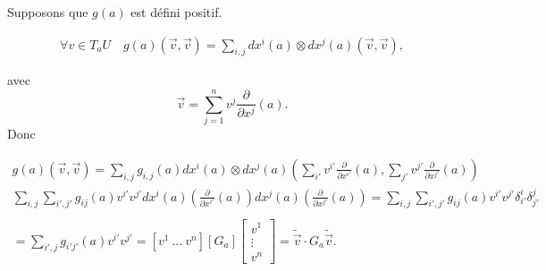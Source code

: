 \documentclass[french]{article}
\theoremstyle{definition}
\begin{document}
Supposons que \(g(a)\) est défini positif.

\begin{gather*}
\forall v\in T_aU \quad   g(a)(\vec{v}, \vec{v}) = \sum_{i,j}^{} d x ^{i}(a) \otimes d x ^{j}(a)(\vec{v}, \vec{v}),
\end{gather*}

avec   $$\vec{v} = \sum_{j=1}^{n} v ^{j} \frac{\partial  }{\partial x ^{j}} (a).$$
Donc

\begin{gather*}
g(a)(\vec{v}, \vec{v})   =  \sum_{i,j}^{} g _{i,j}(a) d x^{i}(a) \otimes d x^{j}(a) \left(\sum_{i'}v ^{i'} \frac{\partial  }{\partial x ^{i'}}(a), \sum_{j'}^{} v ^{j'} \frac{\partial  }{\partial x ^{j'}}(a)\right) \\
 \sum_{i,j} \sum_{i',j'} g _{ij}(a) v ^{i'} v ^{j'} d x^{i}(a) \left(\frac{\partial  }{\partial x ^{i'}}(a) \right)   d x^{j}(a)  \left( \frac{\partial  }{\partial x ^{j'}}(a) \right)=\sum_{i,j} \sum_{i',j'} g _{ij}(a) v ^{i'} v ^{j'} \delta^{i}_{i'} \delta^{j}_{j'} \\
 \\ = \sum_{i',j} g _{i'j'}(a) v ^{i'} v ^{j'}
  = [v ^{1} \ \dots \ v ^{n}] [G_a] \left[\begin{matrix}
    v ^{1} \\
    \vdots \\
    v ^{n}
  \end{matrix}\right] = \tilde{\vec{v}} \cdot G_a \tilde{\vec{v}}.
\end{gather*}

\end{document}
